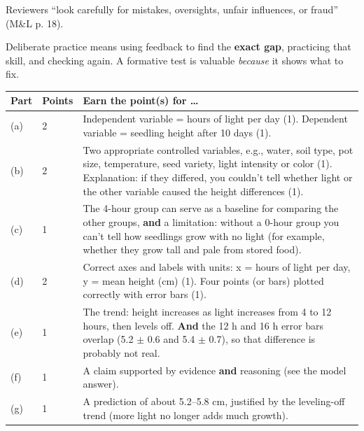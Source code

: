 \documentclass[11pt,letterpaper]{article}
\begin{document}
Reviewers ``look carefully for mistakes, oversights, unfair influences, or fraud'' (M\&L p. 18).
\begin{whynot}
\end{whynot}

Deliberate practice means using feedback to find the \textbf{exact gap}, practicing that skill, and checking again. A formative test is valuable \emph{because} it shows what to fix.
\begin{whynot}
\end{whynot}



\begin{center}
\begin{tabularx}{\linewidth}{@{}llY@{}}
\toprule
Part & Points & Earn the point(s) for \dots{} \\
\midrule
(a) & 2 & Independent variable = hours of light per day (1). Dependent variable = seedling height after 10 days (1). \\
(b) & 2 & Two appropriate controlled variables, e.g., water, soil type, pot size, temperature, seed variety, light intensity or color (1). Explanation: if they differed, you couldn't tell whether light or the other variable caused the height differences (1). \\
(c) & 1 & The 4-hour group can serve as a baseline for comparing the other groups, \textbf{and} a limitation: without a 0-hour group you can't tell how seedlings grow with no light (for example, whether they grow tall and pale from stored food). \\
(d) & 2 & Correct axes and labels with units: x = hours of light per day, y = mean height (cm) (1). Four points (or bars) plotted correctly with error bars (1). \\
(e) & 1 & The trend: height increases as light increases from 4 to 12 hours, then levels off. \textbf{And} the 12 h and 16 h error bars overlap (5.2 $\pm$ 0.6 and 5.4 $\pm$ 0.7), so that difference is probably not real. \\
(f) & 1 & A claim supported by evidence \textbf{and} reasoning (see the model answer). \\
(g) & 1 & A prediction of about 5.2–5.8 cm, justified by the leveling-off trend (more light no longer adds much growth). \\
\bottomrule
\end{tabularx}
\end{center}
\end{document}
